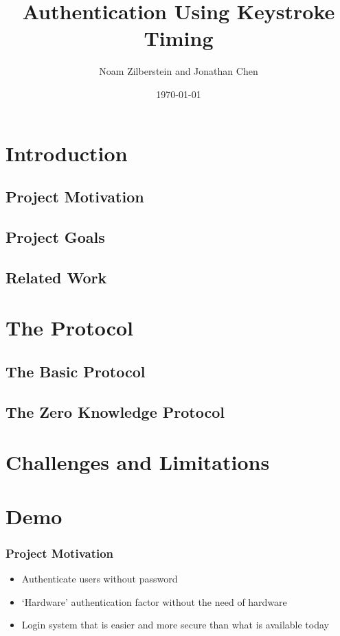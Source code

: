\documentclass{beamer}
\title{Authentication Using Keystroke Timing}
\author{Noam Zilberstein and Jonathan Chen}
\date{\today}
\begin{document}
\frame{\titlepage}

\section[Outline]{}
\frame{\tableofcontents}

\section{Introduction}
\subsection{Project Motivation}
\subsection{Project Goals}
\subsection{Related Work}
\section{The Protocol}
\subsection{The Basic Protocol}
\subsection{The Zero Knowledge Protocol}
\section{Challenges and Limitations}
\section{Demo}

\frame
{
  \frametitle{Project Motivation}

  \begin{itemize}
  \item<1-> Authenticate users without password
  \item<2-> `Hardware' authentication factor without the need of hardware
  \item<3-> Login system that is easier and more secure than what is available today
  \end{itemize}
}
\end{document}
